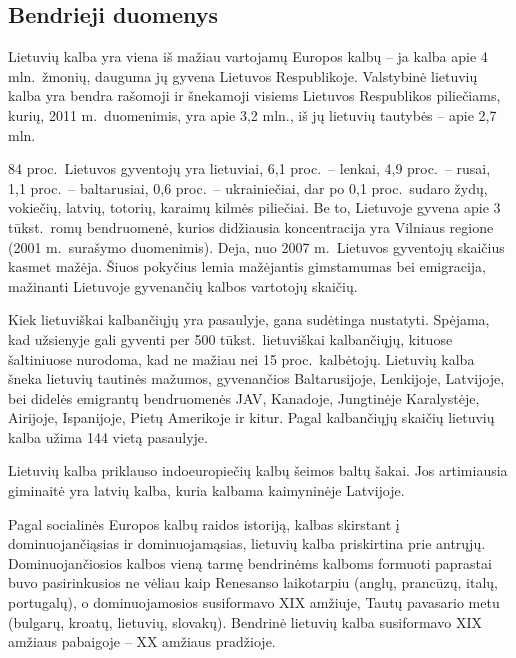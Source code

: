 \begin{multicols}{2}

\subsection{Bendrieji duomenys }

 Lietuvių kalba yra viena iš mažiau vartojamų Europos kalbų – ja kalba apie 4 mln.~žmonių, dauguma jų gyvena Lietuvos Respublikoje. Valstybinė lietuvių kalba yra bendra rašomoji ir šnekamoji visiems Lietuvos Respublikos piliečiams, kurių, 2011 m.~duomenimis, yra apie 3,2 mln., iš jų lietuvių tautybės – apie 2,7 mln.  

84 proc.~Lietuvos gyventojų yra lietuviai, 6,1 proc.~– lenkai, 4,9 proc.~– rusai, 1,1 proc.~– baltarusiai, 0,6 proc.~– ukrainiečiai, dar po 0,1 proc.~sudaro žydų, vokiečių, latvių, totorių, karaimų kilmės piliečiai. Be to, Lietuvoje gyvena apie 3 tūkst.~romų bendruomenė, kurios didžiausia koncentracija yra Vilniaus regione (2001 m.~surašymo duomenimis). Deja, nuo 2007 m.~Lietuvos gyventojų skaičius kasmet mažėja. Šiuos pokyčius lemia mažėjantis gimstamumas bei emigracija, mažinanti Lietuvoje gyvenančių kalbos vartotojų skaičių.


Kiek lietuviškai kalbančiųjų yra pasaulyje, gana sudėtinga nustatyti. Spėjama, kad užsienyje gali gyventi per 500 tūkst.~lietuviškai kalbančiųjų, kituose šaltiniuose nurodoma, kad ne mažiau nei 15 proc.~kalbėtojų. Lietuvių kalba šneka lietuvių tautinės mažumos, gyvenančios Baltarusijoje, Lenkijoje, Latvijoje, bei didelės emigrantų bendruomenės JAV, Kanadoje, Jungtinėje Karalystėje, Airijoje, Ispanijoje, Pietų Amerikoje ir kitur. Pagal kalbančiųjų skaičių lietuvių kalba užima 144 vietą pasaulyje.  

 Lietuvių kalba priklauso indoeuropiečių kalbų šeimos baltų šakai. Jos artimiausia giminaitė yra latvių kalba, kuria kalbama kaimyninėje Latvijoje.   

Pagal socialinės Europos kalbų raidos istoriją, kalbas skirstant į dominuojančiąsias ir dominuojamąsias, lietuvių kalba priskirtina prie antrųjų. Dominuojančiosios kalbos vieną tarmę bendrinėms kalboms formuoti paprastai buvo pasirinkusios ne vėliau kaip Renesanso laikotarpiu (anglų, prancūzų, italų, portugalų), o dominuojamosios susiformavo XIX amžiuje, Tautų pavasario metu (bulgarų, kroatų, lietuvių, slovakų). Bendrinė lietuvių kalba susiformavo XIX amžiaus pabaigoje – XX amžiaus pradžioje.   


\end{multicols}
